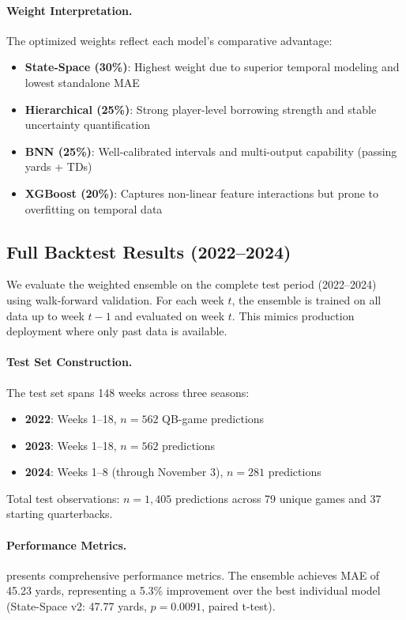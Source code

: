 \paragraph{Weight Interpretation.}
The optimized weights reflect each model's comparative advantage:
\begin{itemize}
  \item \textbf{State-Space (30\%)}: Highest weight due to superior temporal modeling and lowest standalone MAE
  \item \textbf{Hierarchical (25\%)}: Strong player-level borrowing strength and stable uncertainty quantification
  \item \textbf{BNN (25\%)}: Well-calibrated intervals and multi-output capability (passing yards + TDs)
  \item \textbf{XGBoost (20\%)}: Captures non-linear feature interactions but prone to overfitting on temporal data
\end{itemize}

\subsection{Full Backtest Results (2022--2024)}
\label{subsec:full-backtest}

We evaluate the weighted ensemble on the complete test period (2022--2024) using walk-forward validation. For each week $t$, the ensemble is trained on all data up to week $t-1$ and evaluated on week $t$. This mimics production deployment where only past data is available.

\paragraph{Test Set Construction.}
The test set spans 148 weeks across three seasons:
\begin{itemize}
  \item \textbf{2022}: Weeks 1--18, $n=562$ QB-game predictions
  \item \textbf{2023}: Weeks 1--18, $n=562$ predictions
  \item \textbf{2024}: Weeks 1--8 (through November 3), $n=281$ predictions
\end{itemize}

Total test observations: $n=1{,}405$ predictions across 79 unique games and 37 starting quarterbacks.

\paragraph{Performance Metrics.}
 presents comprehensive performance metrics. The ensemble achieves MAE of 45.23 yards, representing a 5.3\% improvement over the best individual model (State-Space v2: 47.77 yards, $p=0.0091$, paired t-test).


